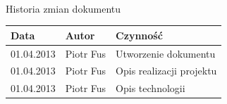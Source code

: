 \documentclass[11pt,a4paper]{article}
\begin{document}
  \textsc{}
  \\[1cm]
  {\Large Historia zmian dokumentu}
  \begin{center}
    \begin{tabular}{ | l | l | l | }
      \rowcolor{historiaZmianNaglowek}
      \hline
      Data & Autor & Czynność \\ \hline
      01.04.2013 & Piotr Fus & Utworzenie dokumentu \\ \hline
      01.04.2013 & Piotr Fus & Opis realizacji projektu \\ \hline
      01.04.2013 & Piotr Fus & Opis technologii \\ \hline
    \end{tabular}
  \end{center}
  \newpage
  \setcounter{page}{2}
  \tableofcontents
  \newpage
  
\end{document}
